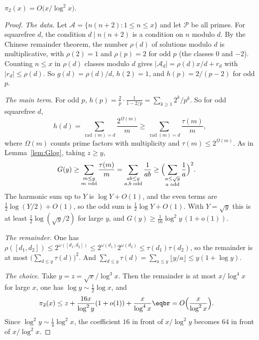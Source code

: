 \begin{theorem}[Brun, 1919]\label{thm:twins}
$\pi_2(x)=O\bigl(x/\log^2x\bigr)$.
\end{theorem}
\begin{proof}
\emph{The data.} Let $\mathcal A=\{n(n+2):1\le n\le x\}$ and let $\mathcal P$ be all primes. For squarefree $d$, the condition $d\mid n(n+2)$ is a condition on $n$ modulo $d$. By the Chinese remainder theorem, the number $\rho(d)$ of solutions modulo $d$ is multiplicative, with $\rho(2)=1$ and $\rho(p)=2$ for odd $p$ (the classes $0$ and $-2$). Counting $n\le x$ in $\rho(d)$ classes modulo $d$ gives $|\mathcal A_d|=\rho(d)x/d+r_d$ with $|r_d|\le\rho(d)$. So $g(d)=\rho(d)/d$, $h(2)=1$, and $h(p)=2/(p-2)$ for odd $p$.

\emph{The main term.} For odd $p$, $h(p)=\frac2p\cdot\frac1{1-2/p}=\sum_{k\ge1}2^k/p^k$. So for odd squarefree $d$,
\[
h(d)=\sum_{\operatorname{rad}(m)=d}\frac{2^{\Omega(m)}}m\ge\sum_{\operatorname{rad}(m)=d}\frac{\tau(m)}m,
\]
where $\Omega(m)$ counts prime factors with multiplicity and $\tau(m)\le2^{\Omega(m)}$. As in Lemma~\ref{lem:Glog}, taking $z\ge y$,
\[
\begin{aligned}G(y)&\ge\sum_{\substack{m\le y\\m\text{ odd}}}\frac{\tau(m)}m=\sum_{\substack{ab\le y\\a,b\text{ odd}}}\frac1{ab}\ge\Bigl(\sum_{\substack{a\le\sqrt y\\a\text{ odd}}}\frac1a\Bigr)^2.\end{aligned}
\]
The harmonic sum up to $Y$ is $\log Y+O(1)$, and the even terms are $\frac12\log(Y/2)+O(1)$, so the odd sum is $\frac12\log Y+O(1)$. With $Y=\sqrt y$ this is at least $\frac12\log(\sqrt y/2)$ for large $y$, and $G(y)\ge\frac1{16}\log^2y\,(1+o(1))$.

\emph{The remainder.} One has $\rho([d_1,d_2])\le2^{\omega([d_1,d_2])}\le2^{\omega(d_1)}2^{\omega(d_2)}\le\tau(d_1)\tau(d_2)$, so the remainder is at most $\bigl(\sum_{d\le y}\tau(d)\bigr)^2$. And $\sum_{d\le y}\tau(d)=\sum_{a\le y}\lfloor y/a\rfloor\le y(1+\log y)$.

\emph{The choice.} Take $y=z=\sqrt x/\log^3x$. Then the remainder is at most $x/\log^4x$ for large $x$, one has $\log y\sim\frac12\log x$, and
\[
\begin{aligned}\pi_2(x)&\le z+\frac{16x}{\log^2y}(1+o(1))+\frac x{\log^4x}\eqbr=O\Bigl(\frac x{\log^2x}\Bigr).\end{aligned}
\]
Since $\log^2y\sim\frac14\log^2x$, the coefficient $16$ in front of $x/\log^2y$ becomes $64$ in front of $x/\log^2x$.
\end{proof}

